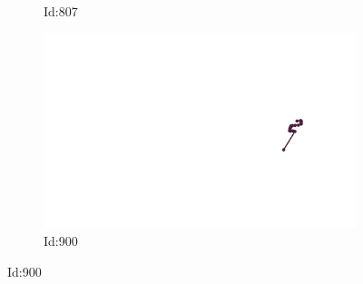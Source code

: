 \documentclass[12pt,twoside]{report}
\begin{document}
\begin{figure}
\begin{subfigure}[b]{0.20\textwidth}
\caption{Id:807}
\end{subfigure}
\begin{subfigure}[b]{0.20\textwidth}
\centering
\includegraphics[width=\textwidth]{../../trajectories/900.png}
\caption{Id:900}
\end{subfigure}
\end{figure}
\end{document}
